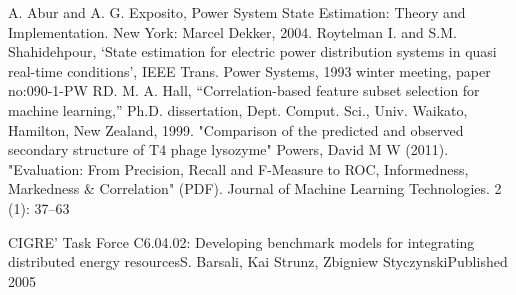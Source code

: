 \begin{thebibliography}{00}
   A. Abur and A. G. Exposito, Power System State Estimation: Theory and Implementation. New York: Marcel Dekker, 2004.
   Roytelman I. and S.M. Shahidehpour, ‘State estimation for electric power distribution systems in quasi real-time conditions’, IEEE Trans. Power Systems, 1993 winter meeting, paper no:090-1-PW RD.
   M. A. Hall, “Correlation-based feature subset selection for machine learning,” Ph.D. dissertation, Dept. Comput. Sci., Univ. Waikato, Hamilton, New Zealand, 1999.
   "Comparison of the predicted and observed secondary structure of T4 phage lysozyme"
    Powers, David M W (2011). "Evaluation: From Precision, Recall and F-Measure to ROC, Informedness, Markedness & Correlation" (PDF). Journal of Machine Learning Technologies. 2 (1): 37–63


   CIGRE' Task Force C6.04.02: Developing benchmark models for integrating distributed energy resourcesS. Barsali, Kai Strunz, Zbigniew StyczynskiPublished 2005

\end{thebibliography}
